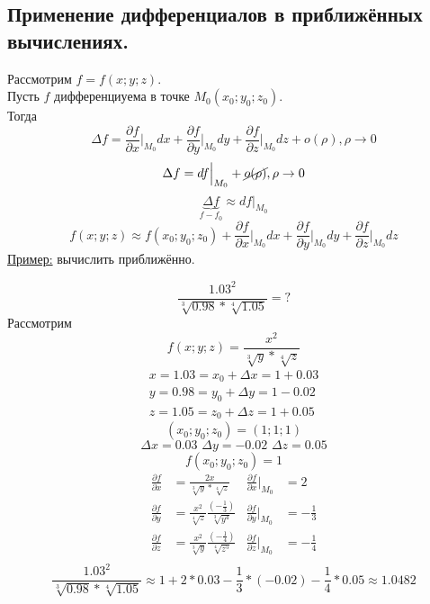 \documentclass[12pt]{article}
\begin{document}
    \subsection{Применение дифференциалов в приближённых вычислениях.}\noindent
    Рассмотрим $f = f(x; y; z)$.\\
    Пусть $f$ дифференциуема в точке $M_0 (x_0; y_0; z_0)$.\\
    Тогда 
    \[ \Delta f = \frac{\partial f}{\partial x} \Big|_{M_0}dx + \frac{\partial f}{\partial y} \Big|_{M_0}dy + \frac{\partial f}{\partial z} \Big|_{M_0}dz + o(\rho), \rho \to 0\]
    \[ \Delta f = df \Big|_{M_0} + \cancel{o(\rho)}, \rho \to 0 \]
    \[ \underbrace{\Delta f}_{f - f_0} \approx df \Big|_{M_0} \]
    \[ \boxed{ f(x; y; z) \approx f(x_0; y_0; z_0) + \frac{\partial f}{\partial x} \Big|_{M_0}dx + \frac{\partial f}{\partial y} \Big|_{M_0}dy + \frac{\partial f}{\partial z} \Big|_{M_0}dz  } \]
    \underline{Пример:} вычислить приближённо.
    \begin{adjustwidth}{1.5em}{1.5em}
        \[ \frac{1.03^2}{\sqrt[3]{0.98} * \sqrt[4]{1.05}} = ? \]
        Рассмотрим 
        \[ f(x; y; z) = \frac{x^2}{\sqrt[3]{y} * \sqrt[4]{z}} \]
        \begin{gather*}
            x = 1.03 = x_0 + \Delta x = 1 + 0.03\\
            y = 0.98 = y_0 + \Delta y = 1 - 0.02\\
            z = 1.05 = z_0 + \Delta z = 1 + 0.05
        \end{gather*}
        \[ (x_0; y_0; z_0) = (1; 1; 1) \]
        \[ \Delta x = 0.03\,\, \Delta y = -0.02\,\, \Delta z = 0.05 \]
        \[ f(x_0; y_0; z_0) = 1 \]
        \begin{align*}
            \frac{\partial f}{\partial x} &= \frac{2x}{\sqrt[3]{y} * \sqrt[4]{z}} & \frac{\partial f}{\partial x} \Big|_{M_0} &= 2\\
            \frac{\partial f}{\partial y} &= \frac{x^2}{\sqrt[4]{z}}\frac{(-\frac{1}{3})}{\sqrt[3]{y^4}} & \frac{\partial f}{\partial y} \Big|_{M_0} &= -\frac{1}{3}\\
            \frac{\partial f}{\partial z} &= \frac{x^2}{\sqrt[3]{y}}\frac{(-\frac{1}{4})}{\sqrt[4]{z^5}} & \frac{\partial f}{\partial z} \Big|_{M_0} &= -\frac{1}{4}\\
        \end{align*}
        \[ \frac{1.03^2}{\sqrt[3]{0.98} * \sqrt[4]{1.05}} \approx 1 + 2 * 0.03 - \frac{1}{3} * (-0.02) - \frac{1}{4} * 0.05 \approx 1.0482 \]
    \end{adjustwidth}
\end{document}
